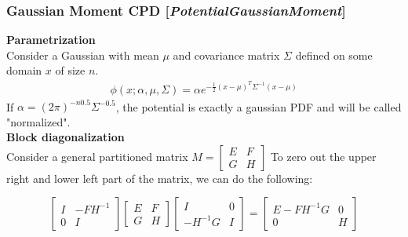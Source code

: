 \documentclass[11pt]{article}
\newcommand{\nllref}[1]{[\small{\textit{#1}}]}
\newcommand{\subsubsubsection}[1]{\noindent\textbf{#1}\\}
\begin{document}
\subsubsection{Gaussian Moment CPD \nllref{PotentialGaussianMoment}}
\subsubsubsection{Parametrization}
Consider a Gaussian with mean $\mu$ and covariance matrix $\Sigma$ defined on some domain $x$ of size $n$.
\begin{align*}
\phi(x; \alpha, \mu, \Sigma) = \alpha  e^{-\frac{1}{2}(x-\mu)^T\Sigma^{-1}(x-\mu)}
\end{align*}
If $\alpha = (2\pi)^{-n0.5} \Sigma^{-0.5}$, the potential is exactly a gaussian PDF and will be called "normalized".\\


\subsubsubsection{Block diagonalization}
Consider a general partitioned matrix $M= \left[ \begin{array}{cc} E & F \\ G & H \end{array} \right]$ To zero out the upper right and lower left part of the matrix, we can do the following:

$$
\left[ \begin{array}{cc} I & -FH^{-1} \\ 0 & I \end{array} \right]
\left[ \begin{array}{cc} E & F \\ G & H \end{array} \right]
\left[ \begin{array}{cc} I & 0 \\ -H^{-1}G & I \end{array} \right]
=
\left[ \begin{array}{cc} E-FH^{-1}G & 0 \\ 0 & H \end{array} \right]
$$
\end{document}
